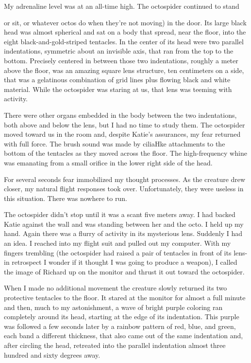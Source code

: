 \documentclass[]{article}
\begin{document}
My adrenaline level was at an all-time high. The octospider continued to stand {or sit, or whatever octos do when they’re not moving) in the door. Its large black head was almost spherical and sat on a body that spread, near the floor, into the eight black-and-gold-striped tentacles. In the center of its head were two parallel indentations, symmetric about an invisible axis, that ran from the top to the bottom. Precisely centered in between those two indentations, roughly a meter above the floor, was an amazing square lens structure, ten centimeters on a side, that was a gelatinous combination of grid lines plus flowing black and white material. While the octospider was staring at us, that lens was teeming with activity.
	
	There were other organs embedded in the body between the two indentations, both above and below the lens, but I had no time to study them. The octospider moved toward us in the room and, despite Katie’s assurances, my fear returned with full force. The brush sound was made by ciliaHke attachments to the bottom of the tentacles as they moved across the floor. The high-frequency whine was emanating from a small orifice in the lower right side of the head.
	
	For several seconds fear immobilized my thought processes. As the creature drew closer, my natural flight responses took over. Unfortunately, they were useless in this situation. There was nowhere to run.
	
	The octospider didn’t stop until it was a scant five meters away. I had backed Katie against the wall and was standing between her and the octo. I held up my hand. Again there was a flurry of activity in its mysterious lens. Suddenly I had an idea. I reached into my flight suit and pulled out my computer. With my fingers trembling (the octospider had raised a pair of tentacles in front of its lens-in retrospect I wonder if it thought I was going to produce a weapon), I called the image of Richard up on the monitor and thrust it out toward the octospider.
	
	When I made no additional movement the creature slowly returned its two protective tentacles to the floor. It stared at the monitor for almost a full minute and then, much to my astonishment, a wave of bright purple coloring ran completely around its head, starting at the edge of its indentation. This purple was followed a few seconds later by a rainbow pattern of red, blue, and green, each band a different thickness, that also came out of the same indentation and, after circling the head, retreated into the parallel indentation almost three hundred and sixty degrees away.
	
}
\end{document}
